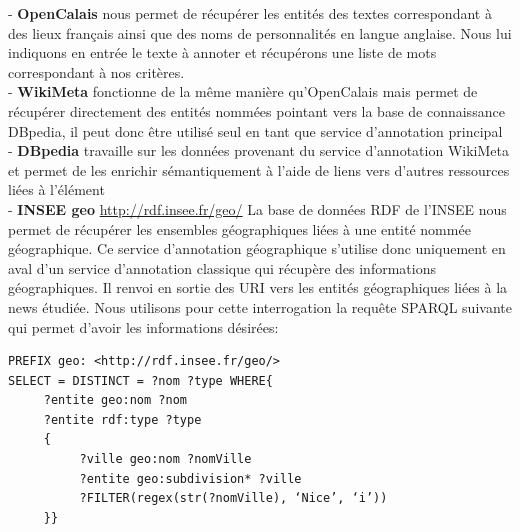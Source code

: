 \documentclass[]{easychair}
\newcommand{\comment}[4]{\par\noindent\hspace*{-0.5cm}{\parbox{\columnwidth}{\textbf{\color{#1}//#2[#3]:#4}}}\par}
\newcommand{\mi}[1]{\comment{blue}{}{#1}{MI}}
\begin{document}
- \textbf{OpenCalais} nous permet de récupérer les entités des textes correspondant à des lieux français ainsi que des noms de personnalités en langue anglaise. Nous lui indiquons en entrée le texte à annoter et récupérons une liste de mots correspondant à nos critères.\\

- \textbf{WikiMeta} fonctionne de la même manière qu'OpenCalais mais permet de récupérer directement des entités nommées pointant vers la base de connaissance DBpedia, il peut donc être utilisé seul en tant que service d'annotation principal \\

- \textbf{DBpedia} travaille sur les données provenant du service d'annotation WikiMeta et permet de les enrichir sémantiquement à l'aide de liens vers d'autres ressources liées à l'élément \\

- \textbf{INSEE geo} \url{http://rdf.insee.fr/geo/} La base de données RDF de l'INSEE nous permet de récupérer les ensembles géographiques liées à une entité nommée géographique. Ce service d'annotation géographique s'utilise donc uniquement en aval d'un service d'annotation classique qui récupère des informations géographiques. Il renvoi en sortie des URI vers les entités géographiques liées à la news étudiée. Nous utilisons pour cette interrogation la requête SPARQL suivante qui permet d'avoir les informations désirées:

\begin{verbatim}
PREFIX geo: <http://rdf.insee.fr/geo/>
SELECT = DISTINCT = ?nom ?type WHERE{
	 ?entite geo:nom ?nom
	 ?entite rdf:type ?type
	 { 
		  ?ville geo:nom ?nomVille
		  ?entite geo:subdivision* ?ville
		  ?FILTER(regex(str(?nomVille), ‘Nice’, ‘i’))
	 }}
\end{verbatim}


\end{document}
